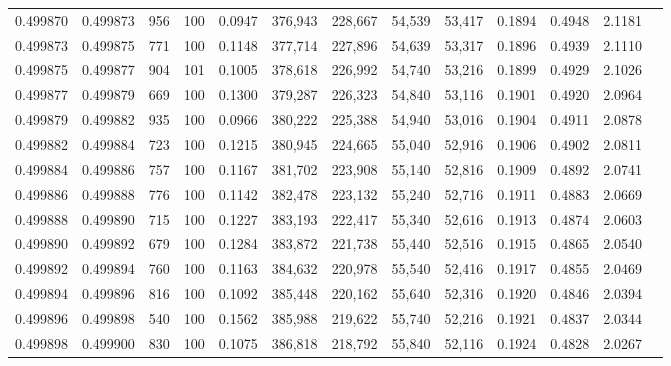 \begin{tabular}{rrrrrrrrrrrrr}
0.499870 & 0.499873 &   956 & 100 &                                     0.0947 & 376,943 & 228,667 &  54,539 &  53,417 & 0.1894 & 0.4948 & 2.1181 \\
0.499873 & 0.499875 &   771 & 100 &                                     0.1148 & 377,714 & 227,896 &  54,639 &  53,317 & 0.1896 & 0.4939 & 2.1110 \\
0.499875 & 0.499877 &   904 & 101 &                                     0.1005 & 378,618 & 226,992 &  54,740 &  53,216 & 0.1899 & 0.4929 & 2.1026 \\
0.499877 & 0.499879 &   669 & 100 &                                     0.1300 & 379,287 & 226,323 &  54,840 &  53,116 & 0.1901 & 0.4920 & 2.0964 \\
0.499879 & 0.499882 &   935 & 100 &                                     0.0966 & 380,222 & 225,388 &  54,940 &  53,016 & 0.1904 & 0.4911 & 2.0878 \\
0.499882 & 0.499884 &   723 & 100 &                                     0.1215 & 380,945 & 224,665 &  55,040 &  52,916 & 0.1906 & 0.4902 & 2.0811 \\
0.499884 & 0.499886 &   757 & 100 &                                     0.1167 & 381,702 & 223,908 &  55,140 &  52,816 & 0.1909 & 0.4892 & 2.0741 \\
0.499886 & 0.499888 &   776 & 100 &                                     0.1142 & 382,478 & 223,132 &  55,240 &  52,716 & 0.1911 & 0.4883 & 2.0669 \\
0.499888 & 0.499890 &   715 & 100 &                                     0.1227 & 383,193 & 222,417 &  55,340 &  52,616 & 0.1913 & 0.4874 & 2.0603 \\
0.499890 & 0.499892 &   679 & 100 &                                     0.1284 & 383,872 & 221,738 &  55,440 &  52,516 & 0.1915 & 0.4865 & 2.0540 \\
0.499892 & 0.499894 &   760 & 100 &                                     0.1163 & 384,632 & 220,978 &  55,540 &  52,416 & 0.1917 & 0.4855 & 2.0469 \\
0.499894 & 0.499896 &   816 & 100 &                                     0.1092 & 385,448 & 220,162 &  55,640 &  52,316 & 0.1920 & 0.4846 & 2.0394 \\
0.499896 & 0.499898 &   540 & 100 &                                     0.1562 & 385,988 & 219,622 &  55,740 &  52,216 & 0.1921 & 0.4837 & 2.0344 \\
0.499898 & 0.499900 &   830 & 100 &                                     0.1075 & 386,818 & 218,792 &  55,840 &  52,116 & 0.1924 & 0.4828 & 2.0267 \\

\end{tabular}
